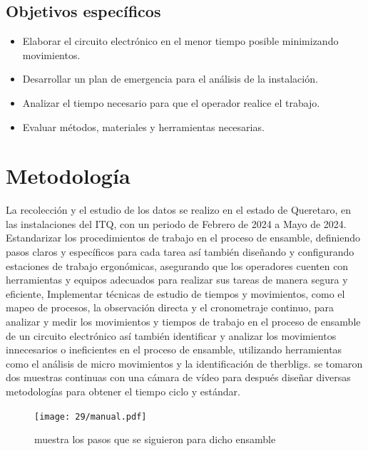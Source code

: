     \subsection{Objetivos específicos}
    
    
    \begin{itemize}
        \item Elaborar el circuito electrónico  en el menor tiempo posible minimizando  movimientos.
        \item Desarrollar un plan de emergencia para el análisis de la instalación.
        \item Analizar el tiempo necesario para que el operador realice el trabajo.
        \item Evaluar métodos, materiales y herramientas necesarias.
    \end{itemize}
    \section{Metodología}
    La recolección y el estudio de los datos se realizo en el estado de Queretaro, en las instalaciones del ITQ, con un periodo de Febrero de 2024 a Mayo de 2024.
    Estandarizar los procedimientos de trabajo en el proceso de ensamble, definiendo pasos claros y específicos para cada tarea así también diseñando  y configurando estaciones de trabajo ergonómicas, asegurando que los operadores  cuenten con herramientas y equipos adecuados para realizar sus tareas de manera segura y eficiente, Implementar técnicas de estudio de tiempos y movimientos, como el mapeo de procesos, la observación directa y el cronometraje continuo, para analizar y medir los movimientos y tiempos de trabajo en el proceso de ensamble de un circuito electrónico  así también identificar y analizar los movimientos innecesarios o ineficientes en el proceso de ensamble, utilizando herramientas como el análisis de micro movimientos y la identificación de therbligs.
    se tomaron  dos muestras continuas con una cámara de vídeo para después diseñar diversas metodologías para obtener el tiempo ciclo y estándar.
    \begin{figure}[H]
        \centering
        \texttt{[image: 29/manual.pdf]}
        \caption{muestra los pasos que se siguieron para dicho ensamble }
        \label{fig:manual.pdf}
    \end{figure}
